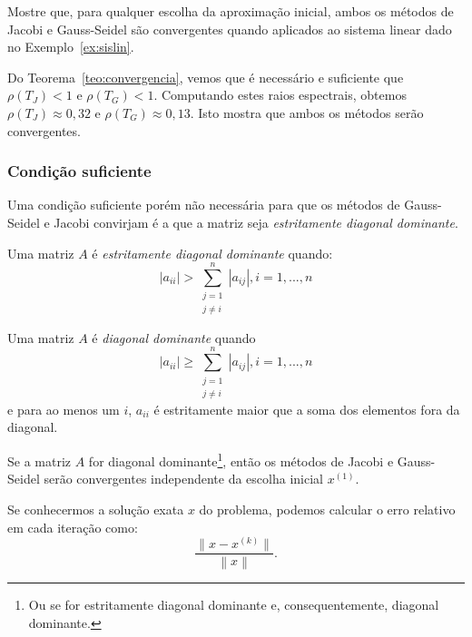 \begin{ex}
  Mostre que, para qualquer escolha da aproximação inicial, ambos os métodos de Jacobi e Gauss-Seidel são convergentes quando aplicados ao sistema linear dado no Exemplo~\ref{ex:sislin}.
\end{ex}
\begin{sol}
  Do Teorema~\ref{teo:convergencia}, vemos que é necessário e suficiente que $\rho(T_J) < 1$ e $\rho(T_G) < 1$. Computando estes raios espectrais, obtemos $\rho(T_J) \approx 0,32$ e $\rho(T_G) \approx 0,13$. Isto mostra que ambos os métodos serão convergentes.
\end{sol}

\subsubsection{Condição suficiente}

Uma condição suficiente porém não necessária para que os métodos de Gauss-Seidel e Jacobi convirjam é a que a matriz seja \emph{estritamente diagonal dominante}.

\begin{defn}
 Uma matriz $A$ é \emph{estritamente diagonal dominante} quando:
\begin{equation}
  \left |a_{ii}\right |> \sum_{\substack{j=1\\j\ne i}}^{n} \left |a_{ij}\right |, i=1,...,n
\end{equation}
\end{defn}

\begin{defn}
 Uma matriz $A$ é \emph{diagonal dominante} quando
\begin{equation}
  \left |a_{ii}\right | \geq \sum_{\substack{j=1\\j\ne i}}^{n} \left |a_{ij}\right |, i=1,...,n
\end{equation}
e para ao menos um $i$, $a_{ii}$ é estritamente maior que a soma dos elementos fora da diagonal.
\end{defn}

\begin{teo}
 Se a matriz $A$ for diagonal dominante\footnote{Ou se for estritamente diagonal dominante e, consequentemente, diagonal dominante.}, então os métodos de Jacobi e Gauss-Seidel serão convergentes independente da escolha inicial $x^{(1)}$.
\end{teo}

Se conhecermos a solução exata $x$ do problema, podemos calcular o erro relativo em cada iteração como:
\begin{equation}
   \frac{ \|x-x^{(k)}\|}{\left\|x\right\|}.
\end{equation}

